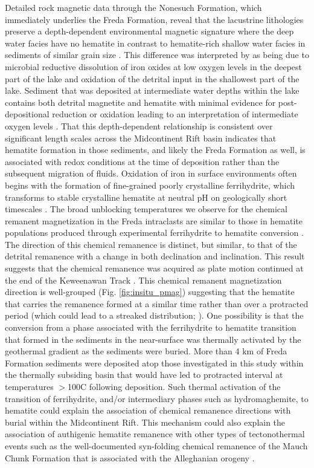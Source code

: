 \documentclass[draft]{agujournal2018}
\begin{document}
Detailed rock magnetic data through the Nonesuch Formation, which immediately underlies the Freda Formation, reveal that the lacustrine lithologies preserve a depth-dependent environmental magnetic signature where the deep water facies have no hematite in contrast to hematite-rich shallow water facies in sediments of similar grain size \citep{Slotznick2018b}. This difference was interpreted by \citet{Slotznick2018b} as being due to microbial reductive dissolution of iron oxides at low oxygen levels in the deepest part of the lake and oxidation of the detrital input in the shallowest part of the lake. Sediment that was deposited at intermediate water depths within the lake contains both detrital magnetite and hematite with minimal evidence for post-depositional reduction or oxidation leading to an interpretation of intermediate oxygen levels \citep{Slotznick2018b}. That this depth-dependent relationship is consistent over significant length scales across the Midcontinent Rift basin indicates that hematite formation in those sediments, and likely the Freda Formation as well, is associated with redox conditions at the time of deposition rather than the subsequent migration of fluids. Oxidation of iron in surface environments often begins with the formation of fine-grained poorly crystalline ferrihydrite, which transforms to stable crystalline hematite at neutral pH on geologically short timescales \citep{Cudennec2006a, Jiang2018a}. The broad unblocking temperatures we observe for the chemical remanent magnetization in the Freda intraclasts are similar to those in hematite populations produced through experimental ferrihydrite to hematite conversion \citep{Jiang2015a}. The direction of this chemical remanence is distinct, but similar, to that of the detrital remanence with a change in both declination and inclination. This result suggests that the chemical remanence was acquired as plate motion continued at the end of the Keweenawan Track \citep{Swanson-Hysell2018a}. This chemical remanent magnetization direction is well-grouped (Fig. \ref{fig:insitu_pmag}) suggesting that the hematite that carries the remanence formed at a similar time rather than over a protracted period (which could lead to a streaked distribution; \citealp{Beck2003b}). One possibility is that the conversion from a phase associated with the ferrihydrite to hematite transition that formed in the sediments in the near-surface was thermally activated by the geothermal gradient as the sediments were buried. More than 4 km of Freda Formation sediments were deposited atop those investigated in this study within the thermally subsiding basin that would have led to protracted interval at temperatures $>$100\textdegree C following deposition. Such thermal activation of the transition of ferrihydrite, and/or intermediary phases such as hydromaghemite, to hematite could explain the association of chemical remanence directions with burial within the Midcontinent Rift. This mechanism could also explain the association of authigenic hematite remanence with other types of tectonothermal events such as the well-documented syn-folding chemical remanence of the Mauch Chunk Formation that is associated with the Alleghanian orogeny \citep{Kent1985b, Opdyke2004a}.
\end{document}
